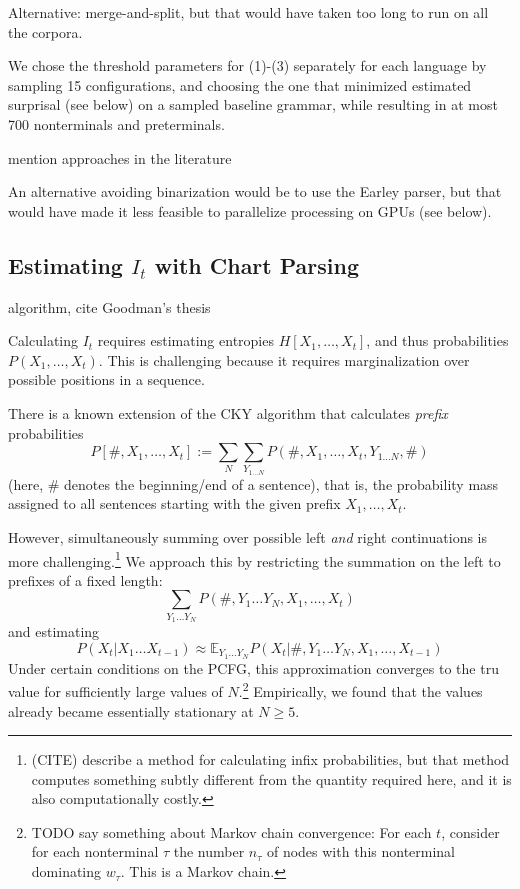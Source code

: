 \documentclass[11pt,letterpaper]{article}
\newcommand{\E}[0]{\mathbb{E}}
\begin{document}
Alternative: merge-and-split, but that would have taken too long to run on all the corpora.

We chose the threshold parameters for (1)-(3) separately for each language by sampling 15 configurations, and choosing the one that minimized estimated surprisal (see below) on a sampled baseline grammar, while resulting in at most 700 nonterminals and preterminals.

mention approaches in the literature

An alternative avoiding binarization would be to use the Earley parser, but that would have made it less feasible to parallelize processing on GPUs (see below).

\subsection{Estimating $I_t$ with Chart Parsing}
algorithm, cite Goodman's thesis

Calculating $I_t$ requires estimating entropies $H[X_1, \dots, X_t]$, and thus probabilities $P(X_1, \dots, X_t)$.
This is challenging because it requires marginalization over possible positions in a sequence.

There is a known extension of the CKY algorithm that calculates \emph{prefix} probabilities
\begin{equation}
P[\#, X_1, \dots, X_t] := \sum_N \sum_{Y_{1\dots N}} P(\#, X_1, \dots, X_t, Y_{1\dots N}, \#)
\end{equation}
(here, $\#$ denotes the beginning/end of a sentence), that is, the probability mass assigned to all sentences starting with the given prefix $X_1, \dots, X_t$.

However, simultaneously summing over possible left \emph{and} right continuations is more challenging.\footnote{(CITE) describe a method for calculating infix probabilities, but that method computes something subtly different from the quantity required here, and it is also computationally costly.}
We approach this by restricting the summation on the left to prefixes of a fixed length:
\begin{equation}
    \sum_{Y_1\dots Y_N} P(\#, Y_1 \dots Y_N, X_1, \dots, X_t)
\end{equation}
and estimating
\begin{equation}
    P(X_t|X_1\dots X_{t-1}) \approx \E_{Y_1\dots Y_N} P(X_t|\#, Y_1 \dots Y_N, X_1, \dots, X_{t-1})
\end{equation}
Under certain conditions on the PCFG, this approximation converges to the tru value for sufficiently large values of $N$.\footnote{TODO say something about Markov chain convergence: For each $t$, consider for each nonterminal $\tau$ the number $n_\tau$ of nodes with this nonterminal dominating $w_\tau$. This is a Markov chain.}
Empirically, we found that the values already became essentially stationary at $N\geq 5$.
\end{document}
